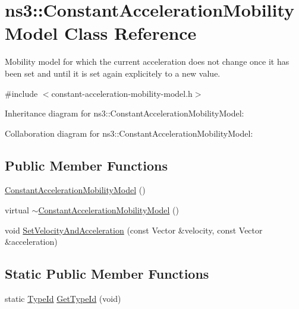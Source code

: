\hypertarget{classns3_1_1ConstantAccelerationMobilityModel}{}\section{ns3\+:\+:Constant\+Acceleration\+Mobility\+Model Class Reference}
\label{classns3_1_1ConstantAccelerationMobilityModel}


Mobility model for which the current acceleration does not change once it has been set and until it is set again explicitely to a new value.  




{\ttfamily \#include $<$constant-\/acceleration-\/mobility-\/model.\+h$>$}



Inheritance diagram for ns3\+:\+:Constant\+Acceleration\+Mobility\+Model\+:


Collaboration diagram for ns3\+:\+:Constant\+Acceleration\+Mobility\+Model\+:
\subsection*{Public Member Functions}
\begin{DoxyCompactItemize}
\item 
\hyperlink{classns3_1_1ConstantAccelerationMobilityModel_a75d333779506b2d0bdd5946a7a8c47bf}{Constant\+Acceleration\+Mobility\+Model} ()
\item 
virtual \hyperlink{classns3_1_1ConstantAccelerationMobilityModel_a41f150f97c0751aa6132cf3974db0aa4}{$\sim$\+Constant\+Acceleration\+Mobility\+Model} ()
\item 
void \hyperlink{classns3_1_1ConstantAccelerationMobilityModel_a063aa35ab488a94ed74ba3f49d329330}{Set\+Velocity\+And\+Acceleration} (const Vector \&velocity, const Vector \&acceleration)
\end{DoxyCompactItemize}
\subsection*{Static Public Member Functions}
\begin{DoxyCompactItemize}
\item 
static \hyperlink{classns3_1_1TypeId}{Type\+Id} \hyperlink{classns3_1_1ConstantAccelerationMobilityModel_a67ac93905fb705dfe4c84f7ae029e57a}{Get\+Type\+Id} (void)
\end{DoxyCompactItemize}
